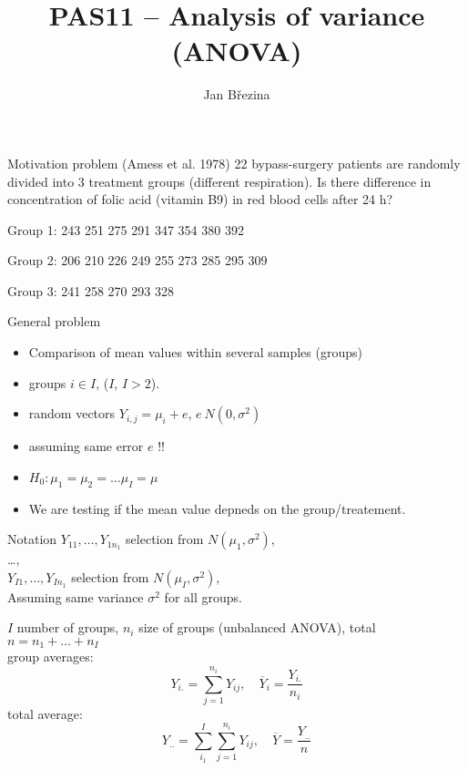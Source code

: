 \documentclass[smaller]{beamer}
\title{PAS11 -- Analysis of variance (ANOVA)}
\author{Jan B\v rezina}
\institute %
{
  Technical University of Liberec
}
\def\ol#1{\overline{#1}}
\def\xskip{{\vspace{2ex}}}
\begin{document}
\begin{frame}
  \titlepage
\end{frame}

\begin{frame}{Motivation problem}
(Amess et al. 1978) 22 bypass-surgery patients are randomly
divided into 3 treatment groups (different respiration). Is there difference in concentration of folic acid 
(vitamin B9) in red blood cells after 24 h?

\xskip
Group 1:
 243 
 251
 275
 291
 347
 354
 380
 392

Group 2:
 206
 210
 226
 249
 255
 273
 285
 295
 309

Group 3:
 241
 258
 270
 293
 328

\end{frame}


\begin{frame}{General problem}
  \begin{itemize}
   \item Comparison of mean values within several samples (groups)\\
   \item groups $i \in I$, ($I$, $I>2$).\\
   \item random vectors $Y_{i,j} = \mu_i+e$, $e~N(0,\sigma^2)$
   \item assuming same error $e$ !!
   \item $H_0: \mu_1=\mu_2=\dots\mu_I=\mu$      
   \item We are testing if the mean value depneds on the group/treatement.
 
  \end{itemize}

\end{frame}

\begin{frame}{Notation}
 $Y_{11}, \dots, Y_{1n_1}$ selection from $N(\mu_1, \sigma^2)$,\\
 \dots,\\
 $Y_{I1}, \dots, Y_{In_1}$ selection from $N(\mu_I, \sigma^2)$,\\
 Assuming same variance $\sigma^2$ for all groups.

\xskip
$I$ number of groups, $n_i$ size of groups (unbalanced ANOVA), total $n = n_1 + \dots + n_I$\\
group averages:
\[
 Y_{i.} = \sum_{j=1}^{n_i} Y_{ij},\quad \ol{Y}_i = \frac{Y_{i.}}{n_i}
\]
total average:
\[
 Y_{..} = \sum_{i_1}^{I}\sum_{j=1}^{n_i} Y_{ij},\quad \ol{Y} = \frac{Y_{..}}{n}
\]

\end{frame}
\end{document}
